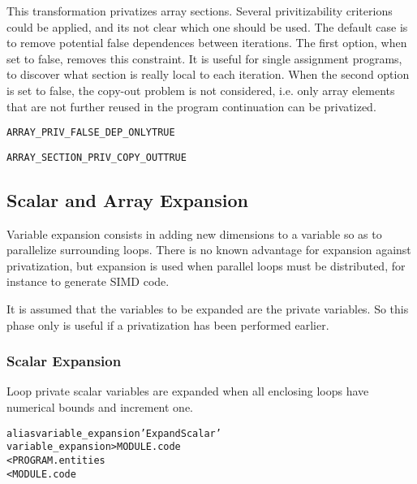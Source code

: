 \documentclass[a4paper]{report}
\newenvironment{PipsProp}{\begin{alltt}}{\end{alltt}}
\newenvironment{PipsMake}{\begin{alltt}}{\end{alltt}}
\begin{document}
This transformation privatizes array sections. Several privitizability
criterions could be applied, and its not clear which one should be used. The
default case is to remove potential false dependences between
iterations. The first option, when set to false, removes this
constraint. It is useful for single assignment programs, to discover what
section is really local to each iteration. When the second option is set to
false, the copy-out problem is not considered, i.e. only array elements that
are not further reused in the program continuation can be privatized.

\begin{PipsProp}
ARRAY_PRIV_FALSE_DEP_ONLY TRUE
\end{PipsProp}

\begin{PipsProp}
ARRAY_SECTION_PRIV_COPY_OUT TRUE
\end{PipsProp}


\subsection{Scalar and Array Expansion}
\label{subsection-scalar-and-array-expansion}

Variable expansion consists in adding new dimensions to a variable so as
to parallelize surrounding loops. There is no known advantage for
expansion against privatization, but expansion is used when parallel loops
must be distributed, for instance to generate SIMD code.

It is assumed that the variables to be expanded are the private
variables. So this phase only is useful if a privatization has been
performed earlier.

\subsubsection{Scalar Expansion}

Loop private scalar variables are expanded when all enclosing loops have
numerical bounds and increment one.

\begin{PipsMake}
alias variable_expansion 'Expand Scalar'
variable_expansion                    > MODULE.code
        < PROGRAM.entities
        < MODULE.code
\end{PipsMake}
\end{document}
